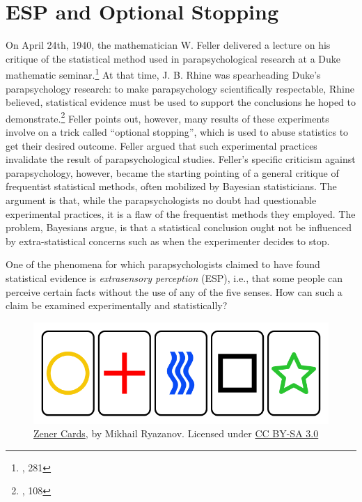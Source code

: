 \hypertarget{esp-and-optional-stopping}{%
\section{ESP and Optional Stopping}\label{sec:esp-and-optional-stopping}}

On April 24th, 1940, the mathematician W. Feller delivered a lecture on
his critique of the statistical method used in parapsychological
research at a Duke mathematic seminar.\footnote{\cite{felleresp}, 281} At that time, J. B. Rhine was
spearheading Duke's parapsychology research: to make parapsychology
scientifically respectable, Rhine believed, statistical evidence must be
used to support the conclusions he hoped to demonstrate.\footnote{\cite{elusive}, 108} Feller points
out, however, many results of these experiments involve on a trick
called ``optional stopping'', which is used to abuse statistics to get
their desired outcome. Feller argued that such experimental practices
invalidate the result of parapsychological studies. Feller's specific
criticism against parapsychology, however, became the starting pointing
of a general critique of frequentist statistical methods, often
mobilized by Bayesian statisticians. The argument is that, while the
parapsychologists no doubt had questionable experimental practices, it is
a flaw of the frequentist methods they employed. The problem, Bayesians
argue, is that a statistical conclusion ought not be influenced by
extra-statistical concerns such as when the experimenter decides to
stop.

One of the phenomena for which parapsychologists claimed to have found
statistical evidence is \emph{extrasensory perception} (ESP), i.e., that some
people can perceive certain facts without the use of any of the five
senses. How can such a claim be examined experimentally and
statistically?

\begin{figure}[h] 
\begin{center}
\includegraphics[scale=0.4]{zener.png}
	\caption{\href{https://commons.wikimedia.org/wiki/File:Zener_cards_(color).svg}{Zener Cards}, by Mikhail Ryazanov. Licensed under \href{https://creativecommons.org/licenses/by-sa/3.0/deed.en}{CC BY-SA 3.0}}
	\label{fig:zen}
\end{center}	
\end{figure}



